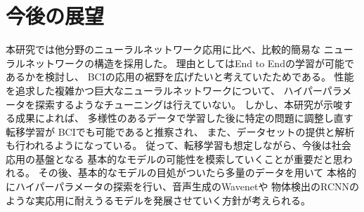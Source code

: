 \section{\mc 今後の展望}
本研究では他分野のニューラルネットワーク応用に比べ、比較的簡易な
ニューラルネットワークの構造を採用した。
理由としてはEnd to Endの学習が可能であるかを検討し、
BCIの応用の裾野を広げたいと考えていたためである。
性能を追求した複雑かつ巨大なニューラルネットワークについて、
ハイパーパラメータを探索するようなチューニングは行えていない。
しかし、本研究が示唆する成果によれば、
多様性のあるデータで学習した後に特定の問題に調整し直す転移学習が
BCIでも可能であると推察され、
また、データセットの提供と解析\cite{eegdataset}も行われるようになっている。
従って、転移学習も想定しながら、今後は社会応用の基盤となる
基本的なモデルの可能性を模索していくことが重要だと思われる。
その後、基本的なモデルの目処がついたら多量のデータを用いて
本格的にハイパーパラメータの探索を行い、音声生成のWavenet\cite{wavenet}や
物体検出のRCNN\cite{RCNN}のような実応用に耐えうるモデルを発展させていく方針が考えられる。
